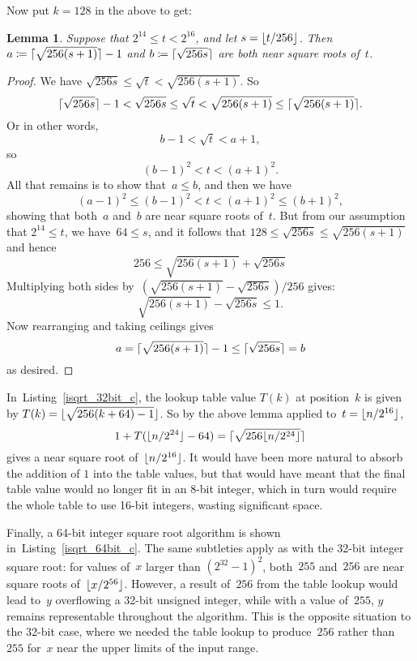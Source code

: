 \documentclass[a4paper]{article}
\DeclarePairedDelimiter\floor{\lfloor}{\rfloor}
\DeclarePairedDelimiter\ceil{\lceil}{\rceil}
\newcommand{\isqrt}[1]{\floor{\sqrt{#1}}}
\newcommand{\csqrt}[1]{\ceil{\sqrt{#1}}}
\theoremstyle{plain}
\newtheorem{lemma}[theorem]{Lemma}
\theoremstyle{definition}
\begin{document}
Now put $k=128$ in the above to get:

\begin{lemma} Suppose that $2^{14} \le t < 2^{16}$, and let $s = \floor{t /
256}$. Then $a \coloneqq \csqrt{256(s+1)} - 1$ and $b \coloneqq \csqrt{256s}$
are both near square roots of~$t$.
\end{lemma}

\begin{proof}
We have $\sqrt{256s} \le \sqrt{t} <
\sqrt{256(s+1)}$. So
$$\csqrt{256s} - 1 < \sqrt{256s} \le \sqrt t < \sqrt{256(s+1)} \le \csqrt{256(s+1)}.$$
Or in other words,
$$b - 1 < \sqrt t < a + 1,$$
so
$$(b - 1)^2 < t < (a + 1)^2.$$
All that remains is to show that~$a\le b$, and then we have
$$(a - 1)^2 \le (b - 1)^2 < t < (a + 1)^2 \le (b + 1)^2,$$ showing that
both~$a$ and~$b$ are near square roots of~$t$. But from our assumption that
$2^{14} \le t$, we have~$64 \le s$, and it follows that $128 \le \sqrt{256s}
\le \sqrt{256(s+1)}$ and hence
$$256 \le \sqrt{256(s+1)} + \sqrt{256s}$$ Multiplying both sides
by~$(\sqrt{256(s+1)} - \sqrt{256s}) / 256$ gives:
$$\sqrt{256(s+1)} - \sqrt{256s} \le 1.$$ Now rearranging and taking ceilings
gives
$$a = \csqrt{256(s+1)} - 1 \le \csqrt{256s} = b$$ as desired.
\end{proof}

In~Listing~\ref{isqrt_32bit_c}, the lookup table value $T(k)$ at position~$k$
is given by $T(k) = \isqrt{256(k + 64) - 1}$. So by the above lemma applied
to~$t=\floor{n / 2^{16}}$,
$$1 + T(\floor{n / 2^{24}} - 64) = \csqrt{256 \floor{n / 2^{24}}}$$ gives a
near square root of~$\floor{n / 2^{16}}$. It would have been more natural to
absorb the addition of $1$ into the table values, but that would have meant
that the final table value would no longer fit in an 8-bit integer, which in
turn would require the whole table to use 16-bit integers, wasting significant
space.

Finally, a 64-bit integer square root algorithm is shown
in~Listing~\ref{isqrt_64bit_c}. The same subtleties apply as with the 32-bit
integer square root: for values of~$x$ larger than $(2^{32} - 1)^2$, both~$255$
and~$256$ are near square roots of~$\floor{x/2^{56}}$. However, a result
of~$256$ from the table lookup would lead to~$y$ overflowing a 32-bit
unsigned integer, while with a value of~$255$, $y$ remains representable
throughout the algorithm. This is the opposite situation to the 32-bit
case, where we needed the table lookup to produce~$256$ rather than $255$
for~$x$ near the upper limits of the input range.
\end{document}
